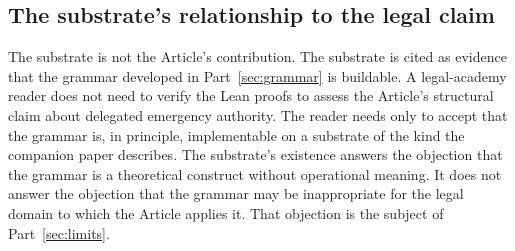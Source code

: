 \subsection{The substrate's relationship to the legal claim}

The substrate is not the Article's contribution.
The substrate is cited as evidence that the grammar developed in Part~\ref{sec:grammar} is buildable.
A legal-academy reader does not need to verify the Lean proofs to assess the Article's structural claim about
delegated emergency authority.
The reader needs only to accept that the grammar is, in principle, implementable on a substrate of the kind
the companion paper describes.
The substrate's existence answers the objection that the grammar is a theoretical construct without operational meaning.
It does not answer the objection that the grammar may be inappropriate for the legal domain to which the Article applies it.
That objection is the subject of Part~\ref{sec:limits}.
